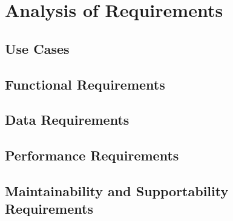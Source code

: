 \chapter{Analysis of Requirements}
\label{ch:analysis-of-requirements}

\section{Use Cases}
\label{sec:use-cases}

\section{Functional Requirements}
\label{sec:functional-requirements}

\section{Data Requirements}
\label{sec:data-requirements}

\section{Performance Requirements}
\label{sec:performance-requirements}

\section{Maintainability and Supportability Requirements}
\label{sec:maintainability-and-supportability-requirements}

